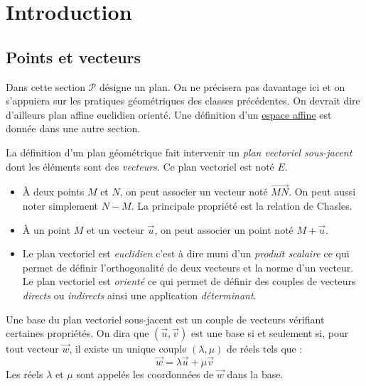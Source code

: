 

\section{Introduction}
\subsection{Points et vecteurs}
Dans cette section $\mathcal P$ désigne un plan. On ne précisera pas davantage ici et on s'appuiera sur les pratiques géométriques des classes précédentes. On devrait dire d'ailleurs plan affine euclidien orienté. Une définition d'un \href{\baseurl C5727.pdf}{espace affine} est donnée dans une autre section.  

La définition d'un plan géométrique fait intervenir un \emph{plan vectoriel sous-jacent} dont les éléments sont des \emph{vecteurs}. Ce plan vectoriel est noté $E$.
\begin{itemize}                                                                                                                                                 \item \`A deux points $M$ et $N$, on peut associer un vecteur noté $\overrightarrow{MN}$. On peut aussi noter simplement $N - M$. La principale propriété est la relation de Chasles.
\item \`A un point $M$ et un vecteur $\overrightarrow u$, on peut associer un point noté $M + \overrightarrow u$.
\item Le plan vectoriel est \emph{euclidien} c'est à dire muni d'un \emph{produit scalaire} ce qui permet de définir l'orthogonalité de deux vecteurs et la norme d'un vecteur. Le plan vectoriel est \emph{orienté} ce qui permet de définir des couples de vecteurs \emph{directs} ou \emph{indirects} ainsi une application \emph{déterminant}.                                                                                                                                                     \end{itemize}
\begin{defi}[base]
 Une base du plan vectoriel sous-jacent est un couple de vecteurs vérifiant certaines propriétés. On dira que $(\overrightarrow u, \overrightarrow v)$ est une base si et seulement si, pour tout vecteur $\overrightarrow w$, il existe un unique couple $(\lambda,\mu)$ de réels tels que :
\begin{displaymath}
 \overrightarrow w = \lambda \overrightarrow u + \mu \overrightarrow v
\end{displaymath}
Les réels $\lambda$ et $\mu$ sont appelés les coordonnées de $\overrightarrow w$ dans la base.
\end{defi}
